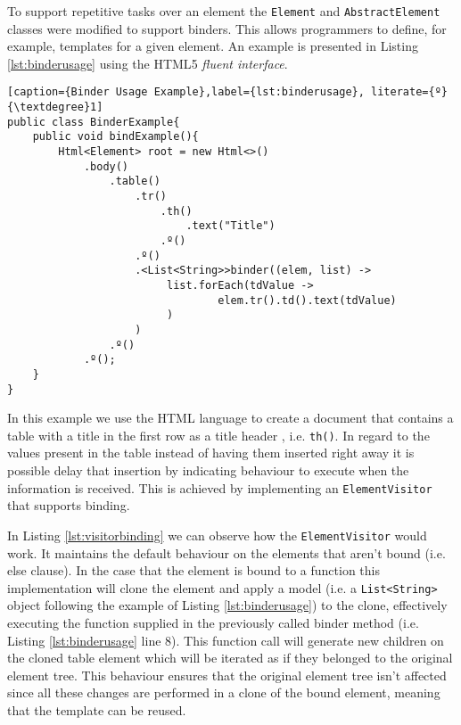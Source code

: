 \noindent
To support repetitive tasks over an element the \texttt{Element} and \texttt{AbstractElement} classes were modified to support binders. This allows programmers to define, for example, templates for a given element. An example is presented in Listing \ref{lst:binderusage} using the \ac{HTML}5 \textit{fluent interface}.

\bigskip


\begin{minipage}{\linewidth}
\begin{lstlisting}[caption={Binder Usage Example},label={lst:binderusage}, literate={º}{\textdegree}1]
public class BinderExample{
    public void bindExample(){
		Html<Element> root = new Html<>()
            .body()
                .table()
                    .tr()
                        .th()
                            .text("Title")
                        .º()
                    .º()
                    .<List<String>>binder((elem, list) ->
                         list.forEach(tdValue ->
                                 elem.tr().td().text(tdValue)
                         )
                    )
                .º()
            .º();
    }
}
\end{lstlisting}
\end{minipage}

\noindent
In this example we use the \ac{HTML} language to create a document that contains a table with a title in the first row as a title header , i.e. \texttt{th()}. In regard to the values present in the table instead of having them inserted right away it is possible delay that insertion by indicating behaviour to execute when the information is received. This is achieved by implementing an \texttt{ElementVisitor} that supports binding. 

\noindent
In Listing \ref{lst:visitorbinding} we can observe how the \texttt{ElementVisitor} would work. It maintains the default behaviour on the elements that aren't bound (i.e. else clause). In the case that the element is bound to a function this implementation will clone the element and apply a model (i.e. a \texttt{List<String>} object following the example of Listing \ref{lst:binderusage}) to the clone, effectively executing the function supplied in the previously called binder method (i.e. Listing \ref{lst:binderusage} line 8). This function call will generate new children on the cloned table element which will be iterated as if they belonged to the original element tree. This behaviour ensures that the original element tree isn't affected since all these changes are performed in a clone of the bound element, meaning that the template can be reused.

